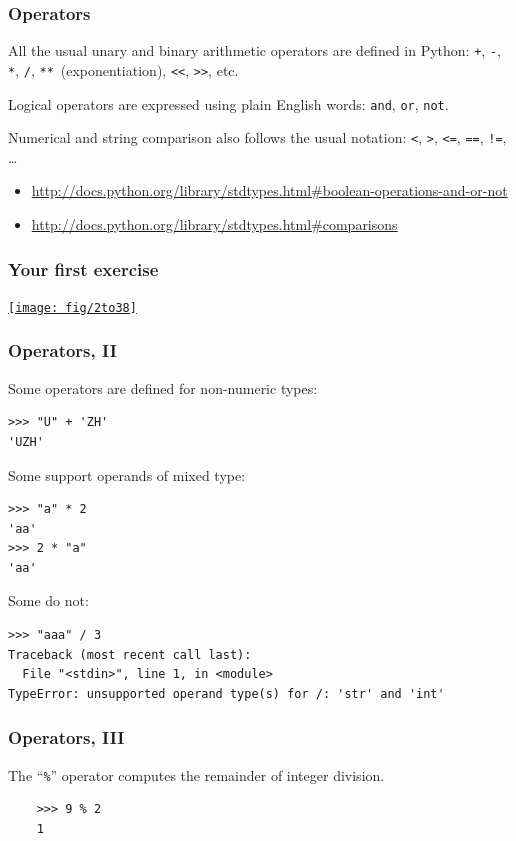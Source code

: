 \documentclass[english,serif,mathserif,xcolor=pdftex,dvipsnames,table]{beamer}
\begin{document}
\begin{frame}[fragile]
  \frametitle{Operators}
  All the usual unary and binary arithmetic operators are
  defined in Python: \texttt{+}, \texttt{-}, \texttt{*}, \texttt{/},
  \texttt{**}~(exponentiation), \texttt{<<}, \texttt{>>}, etc.

  \+
  Logical operators are expressed using plain English words:
  \texttt{and}, \texttt{or}, \texttt{not}.

  \+
  Numerical and string comparison also follows the usual notation:
  \texttt{<}, \texttt{>}, \texttt{<=}, \texttt{==}, \texttt{!=},
  \ldots

  \+
  \begin{references}
    \tiny
    \begin{itemize}
    \item
      \url{http://docs.python.org/library/stdtypes.html#boolean-operations-and-or-not}
    \item
      \url{http://docs.python.org/library/stdtypes.html#comparisons}
    \end{itemize}
  \end{references}
\end{frame}


\begin{frame}
  \frametitle{Your first exercise}
  \href{http://www.pythonchallenge.com}{\texttt{[image: fig/2to38]}}
\end{frame}


\begin{frame}[fragile]
  \frametitle{Operators, II}
  Some operators are defined for non-numeric types:
\begin{lstlisting}
>>> "U" + 'ZH'
'UZH'
\end{lstlisting}

  \+
  Some support operands of mixed type:
\begin{lstlisting}
>>> "a" * 2
'aa'
>>> 2 * "a"
'aa'
\end{lstlisting}

  \+
  Some do not:
\begin{lstlisting}[basicstyle=\footnotesize\ttfamily]
>>> "aaa" / 3
Traceback (most recent call last):
  File "<stdin>", line 1, in <module>
TypeError: unsupported operand type(s) for /: 'str' and 'int'
\end{lstlisting}
\end{frame}


\begin{frame}[fragile]
  \frametitle{Operators, III}
  The ``\texttt{\%}'' operator computes the remainder of integer division.
  \begin{lstlisting}
    >>> 9 % 2
    1
  \end{lstlisting}
\end{frame}
\end{document}
